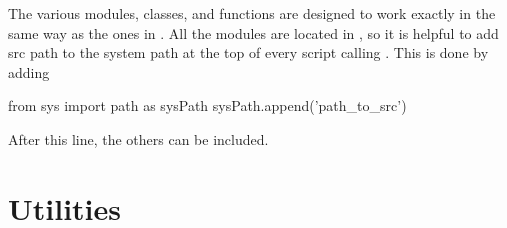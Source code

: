 \documentclass[11pt,a4paper]{article}
\begin{document}
The various \PY modules, classes, and functions are designed to work exactly in the same way as the ones in \CPP. All the modules are located in , so it is helpful to add {\pyin src} path to the system path at the top of every script calling \mimes. This is done by adding
%
\begin{py}
	from sys import path as sysPath
	sysPath.append('path_to_src')
\end{py}
%
After this line, the others can be included.



\section{Utilities}\label{app:util}
\setcounter{equation}{0}
\end{document}
